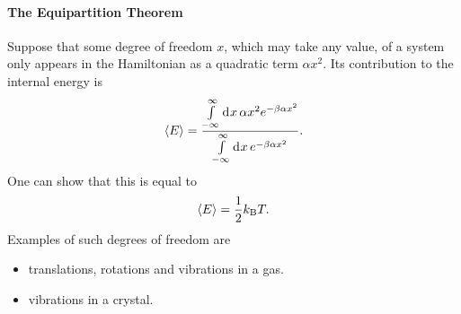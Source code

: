 \paragraph{The Equipartition Theorem}
Suppose that some degree of freedom $x$, which may take any value, of a system only appears in the Hamiltonian as a quadratic term $\alpha x^{2}$. Its contribution to the internal energy is
\begin{align*}
	\expval{E} = \frac{\int\limits_{-\infty}^{\infty}\dd[]{x}\alpha x^{2}e^{-\beta\alpha x^{2}}}{\int\limits_{-\infty}^{\infty}\dd[]{x}e^{-\beta\alpha x^{2}}}.
\end{align*}
One can show that this is equal to
\begin{align*}
	\expval{E} = \frac{1}{2}k_{\text{B}} T.
\end{align*}
Examples of such degrees of freedom are
\begin{itemize}
	\item translations, rotations and vibrations in a gas.
	\item vibrations in a crystal.
\end{itemize}

